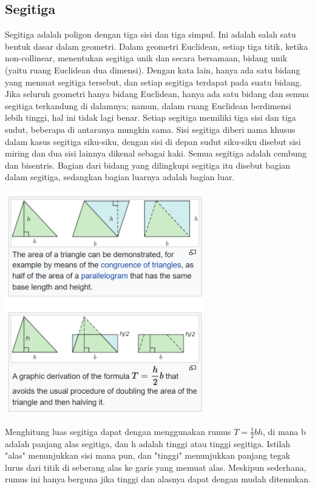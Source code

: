 \subsection{Segitiga}
Segitiga adalah poligon dengan tiga sisi dan tiga simpul. Ini adalah salah satu bentuk dasar dalam geometri. Dalam geometri Euclidean, setiap tiga titik, ketika non-collinear, menentukan segitiga unik dan secara bersamaan, bidang unik (yaitu ruang Euclidean dua dimensi). Dengan kata lain, hanya ada satu bidang yang memuat segitiga tersebut, dan setiap segitiga terdapat pada suatu bidang. Jika seluruh geometri hanya bidang Euclidean, hanya ada satu bidang dan semua segitiga terkandung di dalamnya; namun, dalam ruang Euclidean berdimensi lebih tinggi, hal ini tidak lagi benar. Setiap segitiga memiliki tiga sisi dan tiga sudut, beberapa di antaranya mungkin sama. Sisi segitiga diberi nama khusus dalam kasus segitiga siku-siku, dengan sisi di depan sudut siku-siku disebut sisi miring dan dua sisi lainnya dikenal sebagai kaki. Semua segitiga adalah cembung dan bisentris. Bagian dari bidang yang dilingkupi segitiga itu disebut bagian dalam segitiga, sedangkan bagian luarnya adalah bagian luar.\citep{segitiga}
\setlength{\belowcaptionskip}{-5pt}
\begin{center}
	\includegraphics[width=0.65\textwidth]{gambar/luassegitiga.png}
\end{center}
Menghitung luas segitiga dapat dengan menggunakan rumus $T = \frac{1}{2} bh$, di mana b adalah panjang alas segitiga, dan h adalah tinggi atau tinggi segitiga. Istilah "alas" menunjukkan sisi mana pun, dan "tinggi" menunjukkan panjang tegak lurus dari titik di seberang alas ke garis yang memuat alas. Meskipun sederhana, rumus ini hanya berguna jika tinggi dan alasnya dapat dengan mudah ditemukan.\citep{segitiga}

